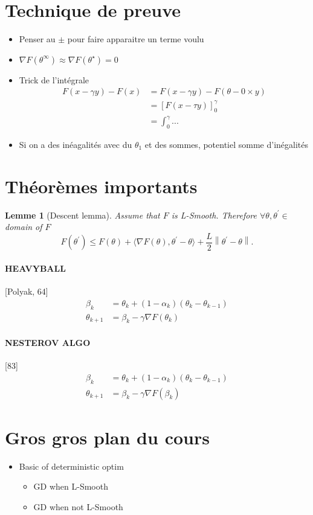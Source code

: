 \documentclass{article}
\theoremstyle{plain}%
\newtheorem{lem}[thm]{Lemme}
\theoremstyle{definition}
\theoremstyle{remark}
\begin{document}
\section{Technique de preuve}
\begin{itemize}
    \item Penser au $ \pm  $ pour faire apparaitre un terme voulu
    \item $ \nabla F(\theta ^\infty ) \approx \nabla F(\theta ^\star ) = 0 $ 
    \item Trick de l'intégrale \begin{align*}
        F(x - \gamma y) - F(x) &= F(x - \gamma y) - F(\theta - 0 \times y) \\
        &= \left[ F(x - \tau y) \right]_0 ^\gamma \\
        &= \int_{0}^{\gamma } ... 
    \end{align*}
    \item Si on a des inéagalités avec du $ \theta _1 $ et des sommes, potentiel somme d'inégalités
\end{itemize}

\section{Théorèmes importants}
\begin{lem}[Descent lemma]
    Assume that $ F $  is L-Smooth. Therefore $ \forall \theta , \theta ^\prime \in  $ domain of $ F $ 
    \[
        F(\theta ^\prime ) \leq  F(\theta ) + \langle \nabla F(\theta ) , \theta ^\prime  - \theta \rangle + \frac{L}{2} \left\| \theta ^\prime  - \theta  \right\| 
    .\]
\end{lem}

\paragraph*{HEAVYBALL}[Polyak, 64]
\begin{align*}
    \beta _k &= \theta _k + (1 - \alpha _k) (\theta _k - \theta _{k-1}) \\
    \theta _{k+1} &= \beta _k - \gamma \nabla F(\theta _k)
\end{align*}

\paragraph*{NESTEROV ALGO}[83]
\begin{align*}
    \beta _k &= \theta _k + (1 - \alpha _k) (\theta _k - \theta _{k-1}) \\
    \theta _{k+1} &= \beta _k - \gamma \nabla F(\beta _k)
\end{align*}

\section{Gros gros plan du cours}
\begin{itemize}
    \item Basic of deterministic optim
    \begin{itemize}
        \item GD when L-Smooth
        \item GD when not L-Smooth
    \end{itemize}
\end{itemize}
\end{document}

